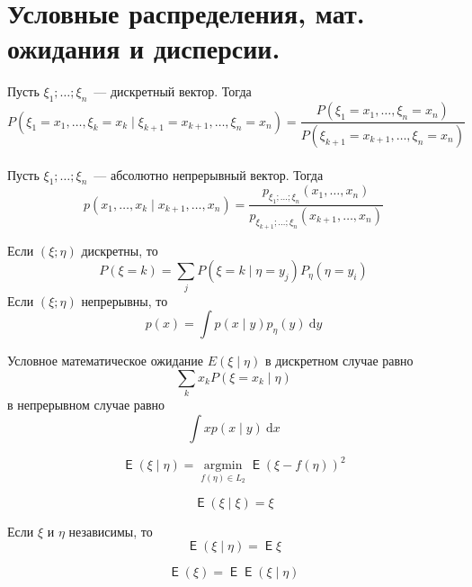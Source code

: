 \documentclass{article}
\DeclareMathOperator{\Expected}{\mathsf{E}}
\begin{document}
    \section{Условные распределения, мат. ожидания и дисперсии.}
    \begin{claim}
        Пусть $\xi_1;\ldots;\xi_n$~--- дискретный вектор. Тогда
        $$
        P(\xi_1=x_1,\ldots,\xi_k=x_k\mid \xi_{k+1}=x_{k+1},\ldots,\xi_n=x_n)=\frac{P(\xi_1=x_1,\ldots,\xi_n=x_n)}{P(\xi_{k+1}=x_{k+1},\ldots,\xi_n=x_n)}
        $$
        \\
        Пусть $\xi_1;\ldots;\xi_n$~--- абсолютно непрерывный вектор. Тогда
        $$
        p(x_1,\ldots,x_k\mid x_{k+1},\ldots,x_n)=\frac{p_{\xi_1;\ldots;\xi_n}(x_1,\ldots,x_n)}{p_{\xi_{k+1};\ldots;\xi_n}(x_{k+1},\ldots,x_n)}
        $$
    \end{claim}
    \begin{corollary}
        Если $(\xi;\eta)$ дискретны, то
        $$
        P(\xi=k)=\sum\limits_jP(\xi=k\mid\eta=y_j)P_\eta(\eta=y_i)
        $$
        Если $(\xi;\eta)$ непрерывны, то
        $$
        p(x)=\int p(x\mid y)p_\eta(y)~\mathrm dy
        $$
    \end{corollary}
    \begin{definition}
        Условное математическое ожидание $E(\xi\mid\eta)$ в дискретном случае равно
        $$
        \sum\limits_kx_kP(\xi=x_k\mid\eta)
        $$
        в непрерывном случае равно
        $$
        \int xp(x\mid y)~\mathrm dx
        $$
    \end{definition}
    \begin{property}
        $$
        \Expected(\xi\mid\eta)=\operatorname*{argmin}_{f(\eta)\in L_2}\Expected(\xi-f(\eta))^2
        $$
    \end{property}
    \begin{property}
        $$
        \Expected(\xi\mid\xi)=\xi
        $$
    \end{property}
    \begin{property}
        Если $\xi$ и $\eta$ независимы, то
        $$
        \Expected(\xi\mid\eta)=\Expected\xi
        $$
    \end{property}
    \begin{claim}
        \begin{property}
            $$
            \Expected(\xi)=\Expected\Expected(\xi\mid\eta)
            $$
        \end{property}
    \end{claim}
\end{document}
